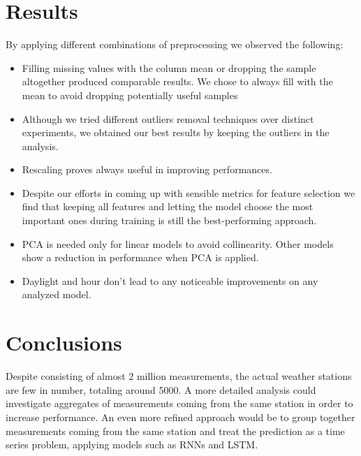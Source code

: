 \documentclass[letterpaper, 10 pt, conference]{ieeeconf}
\begin{document}
    
    \section{Results}
    By applying different combinations of preprocessing we observed the following:
    \begin{itemize} 
        \item Filling missing values with the column mean or dropping the sample altogether produced comparable results. We chose to always fill with the mean to avoid dropping potentially useful samples
        \item Although we tried different outliers removal techniques over distinct experiments, we obtained our best results by keeping the outliers in the analysis.
        \item Rescaling proves always useful in improving performances.
        \item Despite our efforts in coming up with sensible metrics for feature selection we find that keeping all features and letting the model choose the most important ones during training is still the best-performing approach. 
        \item PCA is needed only for linear models to avoid collinearity. Other models show a reduction in performance when PCA is applied.
        \item Daylight and hour don't lead to any noticeable improvements on any analyzed model. 
    \end{itemize} 

    
    
    \section{Conclusions}
    Despite consisting of almost 2 million measurements, the actual weather stations are few in number, totaling around 5000. A more detailed analysis could investigate aggregates of measurements coming from the same station in order to increase performance. An even more refined approach would be to group together measurements coming from the same station and treat the prediction as a time series problem, applying models such as RNNs and LSTM.
    
\end{document}

